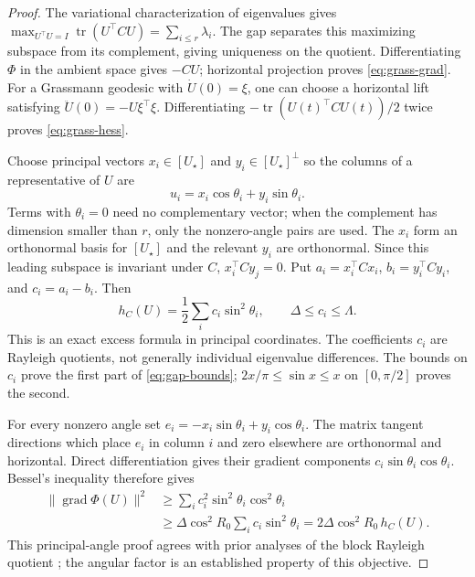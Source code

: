 \begin{proof}
The variational characterization of eigenvalues gives
$\max_{U^\top U=I}\operatorname{tr}(U^\top CU)=\sum_{i\le r}\lambda_i$.
The gap separates this maximizing subspace from its complement, giving
uniqueness on the quotient. Differentiating $\Phi$ in the ambient space gives
$-CU$; horizontal projection proves \eqref{eq:grass-grad}.
For a Grassmann geodesic with $\dot U(0)=\xi$, one can choose a horizontal
lift satisfying $\ddot U(0)=-U\xi^\top\xi$. Differentiating
$-\operatorname{tr}(U(t)^\top CU(t))/2$ twice proves
\eqref{eq:grass-hess}.

Choose principal vectors $x_i\in[U_\star]$ and
$y_i\in[U_\star]^\perp$ so the columns of a representative of $U$ are
\begin{equation}
 u_i=x_i\cos\theta_i+y_i\sin\theta_i.
\end{equation}
Terms with $\theta_i=0$ need no complementary vector; when the complement
has dimension smaller than $r$, only the nonzero-angle pairs are used.
The $x_i$ form an orthonormal basis for $[U_\star]$ and the relevant
$y_i$ are orthonormal. Since this leading subspace is invariant under $C$,
$x_i^\top Cy_j=0$. Put $a_i=x_i^\top Cx_i$,
$b_i=y_i^\top Cy_i$, and $c_i=a_i-b_i$. Then
\begin{equation}
 h_C(U)=\frac12\sum_i c_i\sin^2\theta_i,
 \qquad \Delta\le c_i\le\Lambda.\label{eq:CS-excess}
\end{equation}
This is an exact excess formula in principal coordinates. The coefficients
$c_i$ are Rayleigh quotients, not generally individual eigenvalue
differences. The bounds on $c_i$ prove the first part of
\eqref{eq:gap-bounds}; $2x/\pi\le\sin x\le x$ on $[0,\pi/2]$
proves the second.

For every nonzero angle set
$e_i=-x_i\sin\theta_i+y_i\cos\theta_i$. The matrix tangent directions
which place $e_i$ in column $i$ and zero elsewhere are orthonormal and
horizontal. Direct differentiation gives their gradient components
$c_i\sin\theta_i\cos\theta_i$. Bessel's inequality therefore gives
\begin{align}
 \|\operatorname{grad}\Phi(U)\|^2
 &\ge\sum_i c_i^2\sin^2\theta_i\cos^2\theta_i\\
 &\ge\Delta\cos^2R_0\sum_i c_i\sin^2\theta_i
 =2\Delta\cos^2R_0\,h_C(U).
\end{align}
This principal-angle proof agrees with prior analyses of the block
Rayleigh quotient \cite{alimisis2024geodesic}; the angular factor is an
established property of this objective.


\end{proof}
